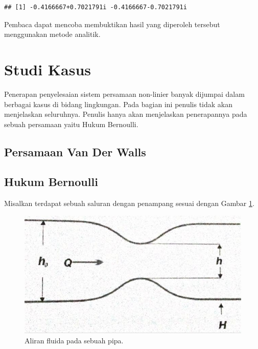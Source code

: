 \documentclass[]{book}
\theoremstyle{definition}
\theoremstyle{definition}
\theoremstyle{definition}
\theoremstyle{remark}
\begin{document}
\begin{verbatim}
## [1] -0.4166667+0.7021791i -0.4166667-0.7021791i
\end{verbatim}

Pembaca dapat mencoba membuktikan hasil yang diperoleh tersebut menggunakan metode analitik.

\hypertarget{studi-kasus}{%
\section{Studi Kasus}\label{studi-kasus}}

Penerapan penyelesaian sistem persamaan non-linier banyak dijumpai dalam berbagai kasus di bidang lingkungan. Pada bagian ini penulis tidak akan menjelaskan seluruhnya. Penulis hanya akan menjelaskan penerapannya pada sebuah persamaan yaitu Hukum Bernoulli.

\hypertarget{persamaan-van-der-walls}{%
\subsection{Persamaan Van Der Walls}\label{persamaan-van-der-walls}}

\hypertarget{hukum-bernoulli}{%
\subsection{Hukum Bernoulli}\label{hukum-bernoulli}}

Misalkan terdapat sebuah saluran dengan penampang sesuai dengan Gambar \ref{fig:bernoulli}.

\begin{figure}

{\centering \includegraphics[width=0.8\linewidth]{./images/bernoulli} 

}

\caption{Aliran fluida pada sebuah pipa.}\label{fig:bernoulli}
\end{figure}
\end{document}
